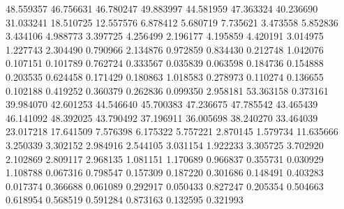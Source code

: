 48.559357
46.756631
46.780247
49.883997
44.581959
47.363324
40.236690
31.033241
18.510725
12.557576
6.878412
5.680719
7.735621
3.473558
5.852836
3.434106
4.988773
3.397725
4.256499
2.196177
4.195859
4.420191
3.014975
1.227743
2.304490
0.790966
2.134876
0.972859
0.834430
0.212748
1.042076
0.107151
0.101789
0.762724
0.333567
0.035839
0.063598
0.184736
0.154888
0.203535
0.624458
0.171429
0.180863
1.018583
0.278973
0.110274
0.136655
0.102188
0.419252
0.360379
0.262836
0.099350
2.958181
53.363158
0.373161
39.984070
42.601253
44.546640
45.700383
47.236675
47.785542
43.465439
46.141092
48.392025
43.790492
37.196911
36.005698
38.240270
33.464039
23.017218
17.641509
7.576398
6.175322
5.757221
2.870145
1.579734
11.635666
3.250339
3.302152
2.984916
2.544105
3.031154
1.922233
3.305725
3.702920
2.102869
2.809117
2.968135
1.081151
1.170689
0.966837
0.355731
0.030929
1.108788
0.067316
0.798547
0.157309
0.187220
0.301686
0.148491
0.403283
0.017374
0.366688
0.061089
0.292917
0.050433
0.827247
0.205354
0.504663
0.618954
0.568519
0.591284
0.873163
0.132595
0.321993
